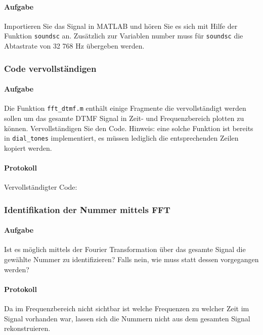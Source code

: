\documentclass[10pt]{report}
\begin{document}
        \paragraph{Aufgabe}
        Importieren Sie das Signal in MATLAB und hören Sie es sich mit Hilfe der Funktion
        \texttt{soundsc} an. Zusätzlich zur Variablen \glqq{}number\grqq{} muss für \texttt{soundsc} die Abtastrate
        von 32 768 Hz übergeben werden.

        \subsubsection{Code vervollständigen}
        \paragraph{Aufgabe}
        Die Funktion \texttt{fft\_dtmf.m} enthält einige Fragmente die vervollständigt werden sollen
        um das gesamte DTMF Signal in Zeit- und Frequenzbereich plotten zu können. Vervollständigen Sie den Code. Hinweis: eine solche Funktion ist bereits in
        \texttt{dial\_tones}
        implementiert, es müssen lediglich die entsprechenden Zeilen kopiert werden.
        \paragraph{Protokoll}

        Vervollständigter Code:

        

        \subsubsection{Identifikation der Nummer mittels FFT}
        \paragraph{Aufgabe}
        Ist es möglich mittels der Fourier Transformation über das gesamte Signal die
        gewählte Nummer zu identifizieren? Falls nein, wie muss statt dessen vorgegangen werden?

        \paragraph{Protokoll}
        Da im Frequenzbereich nicht sichtbar ist welche Frequenzen zu welcher Zeit
        im Signal vorhanden war, lassen sich die Nummern nicht aus dem gesamten
        Signal rekonstruieren.
\end{document}
